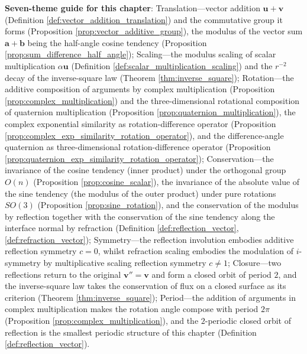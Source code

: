 \begin{remark}
\textbf{Seven-theme guide for this chapter}: Translation---vector addition $\mathbf{u}+\mathbf{v}$ (Definition \ref{def:vector_addition_translation}) and the commutative group it forms (Proposition \ref{prop:vector_additive_group}), the modulus of the vector sum $\mathbf{a}+\mathbf{b}$ being the half-angle cosine tendency (Proposition \ref{prop:sum_difference_half_angle}); Scaling---the modulus scaling of scalar multiplication $\alpha\mathbf{u}$ (Definition \ref{def:scalar_multiplication_scaling}) and the $r^{-2}$ decay of the inverse-square law (Theorem \ref{thm:inverse_square}); Rotation---the additive composition of arguments by complex multiplication (Proposition \ref{prop:complex_multiplication}) and the three-dimensional rotational composition of quaternion multiplication (Proposition \ref{prop:quaternion_multiplication}), the complex exponential similarity as rotation-difference operator (Proposition \ref{prop:complex_exp_similarity_rotation_operator}), and the difference-angle quaternion as three-dimensional rotation-difference operator (Proposition \ref{prop:quaternion_exp_similarity_rotation_operator}); Conservation---the invariance of the cosine tendency (inner product) under the orthogonal group $O(n)$ (Proposition \ref{prop:cosine_scalar}), the invariance of the absolute value of the sine tendency (the modulus of the outer product) under pure rotations $SO(3)$ (Proposition \ref{prop:sine_rotation}), and the conservation of the modulus by reflection together with the conservation of the sine tendency along the interface normal by refraction (Definition \ref{def:reflection_vector}, \ref{def:refraction_vector}); Symmetry---the reflection involution embodies additive reflection symmetry $c=0$, whilst refraction scaling embodies the modulation of $i$-symmetry by multiplicative scaling reflection symmetry $c\neq 1$; Closure---two reflections return to the original $\mathbf{v}''=\mathbf{v}$ and form a closed orbit of period $2$, and the inverse-square law takes the conservation of flux on a closed surface as its criterion (Theorem \ref{thm:inverse_square}); Period---the addition of arguments in complex multiplication makes the rotation angle compose with period $2\pi$ (Proposition \ref{prop:complex_multiplication}), and the $2$-periodic closed orbit of reflection is the smallest periodic structure of this chapter (Definition \ref{def:reflection_vector}).
\end{remark}

